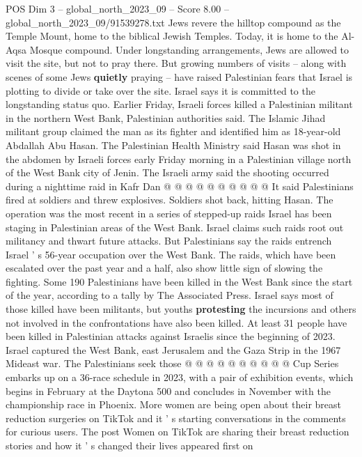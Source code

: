 \begin{textsample}{POS Dim 3 – global\_north\_2023\_09 – Score 8.00 – global\_north\_2023\_09/91539278.txt}
Jews revere the hilltop compound as the Temple Mount, home to the biblical Jewish Temples.
Today, it is home to the Al-Aqsa Mosque compound.
Under longstanding arrangements, Jews are allowed to visit the site, but not to pray there.
But growing numbers of visits -- along with scenes of some Jews \textbf{quietly} praying -- have raised Palestinian fears that Israel is plotting to divide or take over the site.
Israel says it is committed to the longstanding status quo.
Earlier Friday, Israeli forces killed a Palestinian militant in the northern West Bank, Palestinian authorities said.
The Islamic Jihad militant group claimed the man as its fighter and identified him as 18-year-old Abdallah Abu Hasan.
The Palestinian Health Ministry said Hasan was shot in the abdomen by Israeli forces early Friday morning in a Palestinian village north of the West Bank city of Jenin.
The Israeli army said the shooting occurred during a nighttime raid in Kafr Dan @ @ @ @ @ @ @ @ @ @ It said Palestinians fired at soldiers and threw explosives.
Soldiers shot back, hitting Hasan.
The operation was the most recent in a series of stepped-up raids Israel has been staging in Palestinian areas of the West Bank.
Israel claims such raids root out militancy and thwart future attacks.
But Palestinians say the raids entrench Israel ' s 56-year occupation over the West Bank.
The raids, which have been escalated over the past year and a half, also show little sign of slowing the fighting.
Some 190 Palestinians have been killed in the West Bank since the start of the year, according to a tally by The Associated Press.
Israel says most of those killed have been militants, but youths \textbf{protesting} the incursions and others not involved in the confrontations have also been killed.
At least 31 people have been killed in Palestinian attacks against Israelis since the beginning of 2023.
Israel captured the West Bank, east Jerusalem and the Gaza Strip in the 1967 Mideast war.
The Palestinians seek those @ @ @ @ @ @ @ @ @ @ Cup Series embarks up on a 36-race schedule in 2023, with a pair of exhibition events, which begins in February at the Daytona 500 and concludes in November with the championship race in Phoenix.
More women are being open about their breast reduction surgeries on TikTok and it ' s starting conversations in the comments for curious users.
The post Women on TikTok are sharing their breast reduction stories and how it ' s changed their lives appeared first on

\end{textsample}
